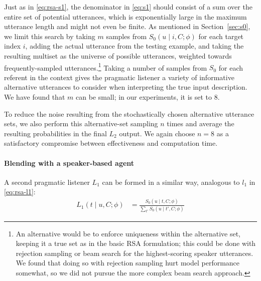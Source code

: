 \documentclass[11pt,letterpaper]{article}
\newcommand{\Listener}{L}
\newcommand{\Speaker}{S}
\newcommand{\utt}{u}
\newcommand{\context}{C}
\newcommand{\target}{t}
\newcommand{\numsamples}{m}
\renewcommand{\|}{\mid}
\newcommand{\secref}[1]{Section~\ref{#1}}
\begin{document}
Just as in \eqref{eq:rsa-s1}, the denominator in \eqref{eq:s1} should consist of a sum over
the entire set of potential utterances, which is exponentially large in the
maximum utterance length and might not even be finite.
As mentioned in \secref{sec:s0}, we limit this search by
taking $\numsamples$ samples from $\Speaker_0(\utt \| i, \context; \phi)$ for
each target index $i$, adding the actual utterance from the testing example,
and taking the resulting multiset as the universe of possible utterances,
weighted towards frequently-sampled utterances.\footnote{An alternative would
be to enforce uniqueness within the alternative set, keeping it a true set as in the
basic RSA formulation; this could be done with rejection sampling or beam search
for the highest-scoring speaker utterances. We found that doing so with
rejection sampling hurt model performance somewhat, so we did not
pursue the more complex beam search approach.} Taking a number
of samples from $\Speaker_0$ for each referent in the context gives the pragmatic
listener a variety of informative alternative utterances to consider when
interpreting the true input description.
We have found that $\numsamples$
can be small; in our experiments, it is set to $8$.

To reduce the noise
resulting from the stochastically chosen alternative utterance sets, we also perform
this alternative-set sampling $n$ times and average the resulting probabilities in
the final $\Listener_2$ output. We again choose $n = 8$ as a satisfactory
compromise between effectiveness and computation time.

\paragraph{Blending with a speaker-based agent} A second pragmatic listener
$\Listener_1$ can be formed in a similar way,
analogous to $l_{1}$ in \eqref{eq:rsa-l1}:
%
\begin{align}
  \Listener_1(\target \| \utt, \context; \phi)
  &=
    \frac{
    \Speaker_0(\utt \| \target, \context; \phi)
    }{
    \sum_{\target'} \Speaker_0(\utt \| \target', \context; \phi)
    }    \label{eq:l1}
\end{align}
\end{document}
